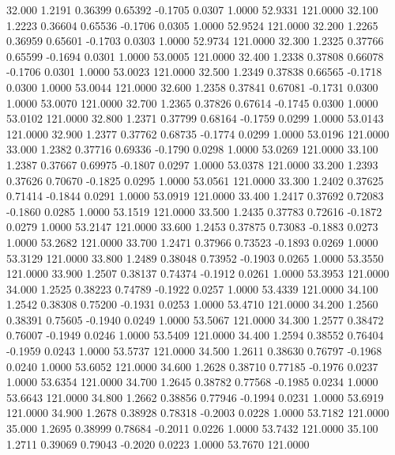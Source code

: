   32.000   1.2191   0.36399   0.65392  -0.1705   0.0307   1.0000  52.9331 121.0000
  32.100   1.2223   0.36604   0.65536  -0.1706   0.0305   1.0000  52.9524 121.0000
  32.200   1.2265   0.36959   0.65601  -0.1703   0.0303   1.0000  52.9734 121.0000
  32.300   1.2325   0.37766   0.65599  -0.1694   0.0301   1.0000  53.0005 121.0000
  32.400   1.2338   0.37808   0.66078  -0.1706   0.0301   1.0000  53.0023 121.0000
  32.500   1.2349   0.37838   0.66565  -0.1718   0.0300   1.0000  53.0044 121.0000
  32.600   1.2358   0.37841   0.67081  -0.1731   0.0300   1.0000  53.0070 121.0000
  32.700   1.2365   0.37826   0.67614  -0.1745   0.0300   1.0000  53.0102 121.0000
  32.800   1.2371   0.37799   0.68164  -0.1759   0.0299   1.0000  53.0143 121.0000
  32.900   1.2377   0.37762   0.68735  -0.1774   0.0299   1.0000  53.0196 121.0000
  33.000   1.2382   0.37716   0.69336  -0.1790   0.0298   1.0000  53.0269 121.0000
  33.100   1.2387   0.37667   0.69975  -0.1807   0.0297   1.0000  53.0378 121.0000
  33.200   1.2393   0.37626   0.70670  -0.1825   0.0295   1.0000  53.0561 121.0000
  33.300   1.2402   0.37625   0.71414  -0.1844   0.0291   1.0000  53.0919 121.0000
  33.400   1.2417   0.37692   0.72083  -0.1860   0.0285   1.0000  53.1519 121.0000
  33.500   1.2435   0.37783   0.72616  -0.1872   0.0279   1.0000  53.2147 121.0000
  33.600   1.2453   0.37875   0.73083  -0.1883   0.0273   1.0000  53.2682 121.0000
  33.700   1.2471   0.37966   0.73523  -0.1893   0.0269   1.0000  53.3129 121.0000
  33.800   1.2489   0.38048   0.73952  -0.1903   0.0265   1.0000  53.3550 121.0000
  33.900   1.2507   0.38137   0.74374  -0.1912   0.0261   1.0000  53.3953 121.0000
  34.000   1.2525   0.38223   0.74789  -0.1922   0.0257   1.0000  53.4339 121.0000
  34.100   1.2542   0.38308   0.75200  -0.1931   0.0253   1.0000  53.4710 121.0000
  34.200   1.2560   0.38391   0.75605  -0.1940   0.0249   1.0000  53.5067 121.0000
  34.300   1.2577   0.38472   0.76007  -0.1949   0.0246   1.0000  53.5409 121.0000
  34.400   1.2594   0.38552   0.76404  -0.1959   0.0243   1.0000  53.5737 121.0000
  34.500   1.2611   0.38630   0.76797  -0.1968   0.0240   1.0000  53.6052 121.0000
  34.600   1.2628   0.38710   0.77185  -0.1976   0.0237   1.0000  53.6354 121.0000
  34.700   1.2645   0.38782   0.77568  -0.1985   0.0234   1.0000  53.6643 121.0000
  34.800   1.2662   0.38856   0.77946  -0.1994   0.0231   1.0000  53.6919 121.0000
  34.900   1.2678   0.38928   0.78318  -0.2003   0.0228   1.0000  53.7182 121.0000
  35.000   1.2695   0.38999   0.78684  -0.2011   0.0226   1.0000  53.7432 121.0000
  35.100   1.2711   0.39069   0.79043  -0.2020   0.0223   1.0000  53.7670 121.0000
